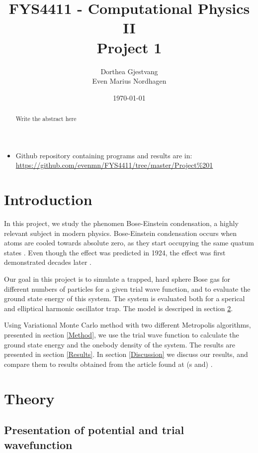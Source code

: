 \documentclass[norsk,a4paper,12pt]{article}
\title{FYS4411 - Computational Physics II\\\vspace{2mm} \Large{Project 1}}
\author{\large Dorthea Gjestvang\\ Even Marius Nordhagen}
\date\today
\begin{document}
\maketitle
\begin{abstract}
Write the abstract here
\par 

\end{abstract}


\begin{itemize}
\item Github repository containing programs and results are in: \url{https://github.com/evenmn/FYS4411/tree/master/Project%201}
\end{itemize}


\section{Introduction}

In this project, we study the  phenomen Bose-Einstein condensation, a highly relevant subject in modern physics.  Bose-Einstein condensation occurs when atoms are cooled towards absolute zero, as they start occupying the same quatum states \cite{JE2016}. Even though the effect was predicted in 1924, the effect was first demonstrated decades later \cite{SP}.

Our goal in this project is to simulate a trapped, hard sphere Bose gas for different numbers of particles for a given trial wave function, and to evaluate the ground state energy of this system. The system is evaluated both for a sperical and elliptical harmonic oscillator trap. The model is descriped in section \ref{Theory}. \par

Using Variational Monte Carlo method with two different Metropolis algorithms, presented in section \ref{Method}, we use the trial wave function to calculate the ground state energy and the onebody density of the system. The results are presented in section \ref{Results}. In section \ref{Discussion} we discuss our results, and compare them to results obtained from the article found at (s \cite{Nilsen} and) \cite{DuBois}.


\section{Theory} \label{Theory}

\subsection{Presentation of potential and trial wavefunction} 
\end{document}
